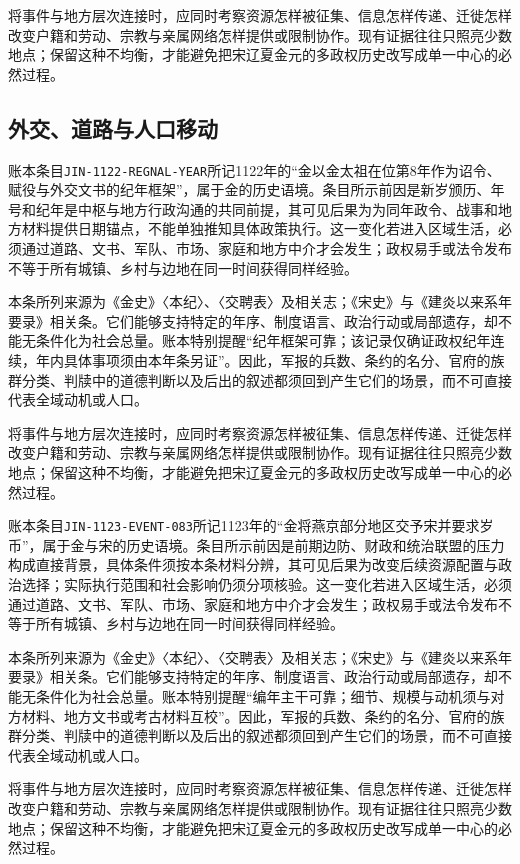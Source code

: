 将事件与地方层次连接时，应同时考察资源怎样被征集、信息怎样传递、迁徙怎样改变户籍和劳动、宗教与亲属网络怎样提供或限制协作。现有证据往往只照亮少数地点；保留这种不均衡，才能避免把宋辽夏金元的多政权历史改写成单一中心的必然过程。

\subsection{外交、道路与人口移动}

账本条目\texttt{JIN-1122-REGNAL-YEAR}所记1122年的“金以金太祖在位第8年作为诏令、赋役与外交文书的纪年框架”，属于金的历史语境。条目所示前因是新岁颁历、年号和纪年是中枢与地方行政沟通的共同前提，其可见后果为为同年政令、战事和地方材料提供日期锚点，不能单独推知具体政策执行。这一变化若进入区域生活，必须通过道路、文书、军队、市场、家庭和地方中介才会发生；政权易手或法令发布不等于所有城镇、乡村与边地在同一时间获得同样经验。

本条所列来源为《金史》〈本纪〉、〈交聘表〉及相关志；《宋史》与《建炎以来系年要录》相关条。它们能够支持特定的年序、制度语言、政治行动或局部遗存，却不能无条件化为社会总量。账本特别提醒“纪年框架可靠；该记录仅确证政权纪年连续，年内具体事项须由本年条另证”。因此，军报的兵数、条约的名分、官府的族群分类、判牍中的道德判断以及后出的叙述都须回到产生它们的场景，而不可直接代表全域动机或人口。

将事件与地方层次连接时，应同时考察资源怎样被征集、信息怎样传递、迁徙怎样改变户籍和劳动、宗教与亲属网络怎样提供或限制协作。现有证据往往只照亮少数地点；保留这种不均衡，才能避免把宋辽夏金元的多政权历史改写成单一中心的必然过程。

账本条目\texttt{JIN-1123-EVENT-083}所记1123年的“金将燕京部分地区交予宋并要求岁币”，属于金与宋的历史语境。条目所示前因是前期边防、财政和统治联盟的压力构成直接背景，具体条件须按本条材料分辨，其可见后果为改变后续资源配置与政治选择；实际执行范围和社会影响仍须分项核验。这一变化若进入区域生活，必须通过道路、文书、军队、市场、家庭和地方中介才会发生；政权易手或法令发布不等于所有城镇、乡村与边地在同一时间获得同样经验。

本条所列来源为《金史》〈本纪〉、〈交聘表〉及相关志；《宋史》与《建炎以来系年要录》相关条。它们能够支持特定的年序、制度语言、政治行动或局部遗存，却不能无条件化为社会总量。账本特别提醒“编年主干可靠；细节、规模与动机须与对方材料、地方文书或考古材料互校”。因此，军报的兵数、条约的名分、官府的族群分类、判牍中的道德判断以及后出的叙述都须回到产生它们的场景，而不可直接代表全域动机或人口。

将事件与地方层次连接时，应同时考察资源怎样被征集、信息怎样传递、迁徙怎样改变户籍和劳动、宗教与亲属网络怎样提供或限制协作。现有证据往往只照亮少数地点；保留这种不均衡，才能避免把宋辽夏金元的多政权历史改写成单一中心的必然过程。

